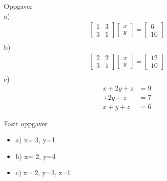 \documentclass[norsk]{beamer}
\newcommand\Fontvithree{\fontsize{15}{7.2}\selectfont}
\begin{document}
\begin{frame}
\Fontvithree
Oppgaver\\
a)
\begin{align*}
\begin{bmatrix}
	1 & 3 \\
	3 & 1
\end{bmatrix}
\begin{bmatrix}
	x \\
	y
\end{bmatrix}
=
\begin{bmatrix}
	6 \\
	10
\end{bmatrix}\\
\end{align*}
b)
\begin{align*}
\begin{bmatrix}
	2 & 2 \\
	3 & 1
\end{bmatrix}
\begin{bmatrix}
	x \\
	y
\end{bmatrix}
=
\begin{bmatrix}
	12 \\
	10
\end{bmatrix}\\
\end{align*}
c)
\begin{align*}
	x + 2y + z &=9\\
      + 2y + z &=7\\
	x + y  + z &=6
\end{align*}
\end{frame}
\begin{frame}{Fasit oppgaver}
\begin{itemize}
	\item a) x= 3, y=1
	\item b) x= 2, y=4
	\item c) x= 2, y=3, z=1
\end{itemize}
\end{frame}
\end{document}
